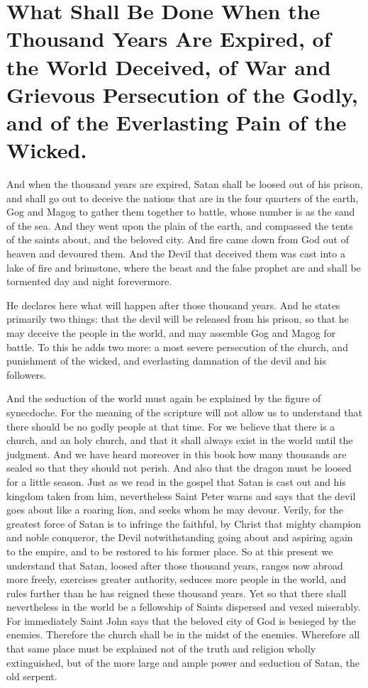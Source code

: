 \chapter[Sermon 89. What Shall Be Done When the Thousand Years Are Expired, of the World Deceived, of War and Grievous Persecution of the Godly, and of the Everlasting Pain of the Wicked.]{What Shall Be Done When the Thousand Years Are Expired, of the World Deceived, of War and Grievous Persecution of the Godly, and of the Everlasting Pain of the Wicked.}
\label{sermon:089}

And when the thousand years are expired, Satan shall be loosed out of his prison, and shall go out to deceive the nations that are in the four quarters of the earth, Gog and Magog to gather them together to battle, whose number is as the sand of the sea. And they went upon the plain of the earth, and compassed the tents of the saints about, and the beloved city. And fire came down from God out of heaven and devoured them. And the Devil that deceived them was cast into a lake of fire and brimstone, where the beast and the false prophet are and shall be tormented day and night forevermore.

He declares here what will happen after those thousand years. And he states primarily two things: that the devil will be released from his prison, so that he may deceive the people in the world, and may assemble Gog and Magog for battle. To this he adds two more: a most severe persecution of the church, and punishment of the wicked, and everlasting damnation of the devil and his followers.

And the seduction of the world must again be explained by the figure of synecdoche. For the meaning of the scripture will not allow us to understand that there should be no godly people at that time. For we believe that there is a church, and an holy church, and that it shall always exist in the world until the judgment. And we have heard moreover in this book how many thousands are sealed so that they should not perish. And also that the dragon must be loosed for a little season. Just as we read in the gospel that Satan is cast out and his kingdom taken from him, nevertheless Saint Peter warns and says that the devil goes about like a roaring lion, and seeks whom he may devour. Verily, for the greatest force of Satan is to infringe the faithful, by Christ that mighty champion and noble conqueror, the Devil notwithstanding going about and aspiring again to the empire, and to be restored to his former place. So at this present we understand that Satan, loosed after those thousand years, ranges now abroad more freely, exercises greater authority, seduces more people in the world, and rules further than he has reigned these thousand years. Yet so that there shall nevertheless in the world be a fellowship of Saints dispersed and vexed miserably. For immediately Saint John says that the beloved city of God is besieged by the enemies. Therefore the church shall be in the midst of the enemies. Wherefore all that same place must be explained not of the truth and religion wholly extinguished, but of the more large and ample power and seduction of Satan, the old serpent.

